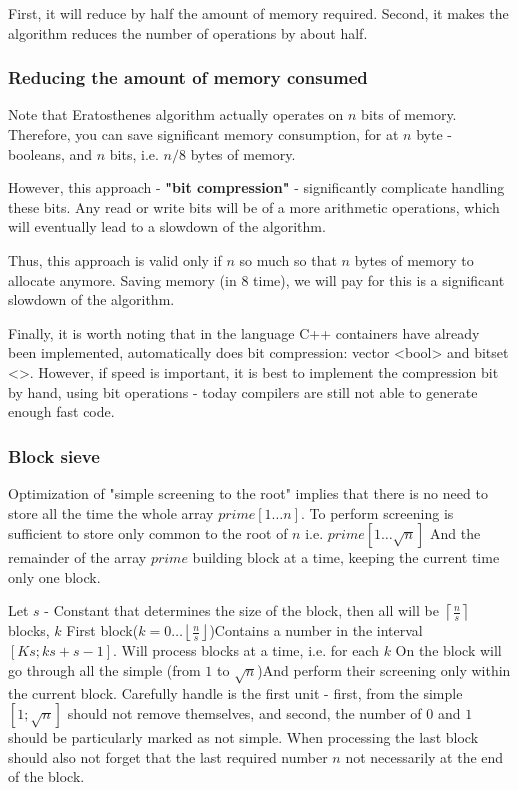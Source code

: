 First, it will reduce by half the amount of memory required. Second, it makes the algorithm reduces the number of operations by about half.

\subsubsection{ Reducing the amount of memory consumed }

Note that Eratosthenes algorithm actually operates on $n$ bits of memory. Therefore, you can save significant memory consumption, for at $n$ byte - booleans, and $n$ bits, i.e. $n / 8$ bytes of memory.

However, this approach - \textbf{"bit compression"} - significantly complicate handling these bits. Any read or write bits will be of a more arithmetic operations, which will eventually lead to a slowdown of the algorithm.

Thus, this approach is valid only if $n$ so much so that $n$ bytes of memory to allocate anymore. Saving memory (in $8$ time), we will pay for this is a significant slowdown of the algorithm.

Finally, it is worth noting that in the language C++ containers have already been implemented, automatically does bit compression: vector <bool> and bitset <>. However, if speed is important, it is best to implement the compression bit by hand, using bit operations - today compilers are still not able to generate enough fast code.

\subsubsection{ Block sieve }

Optimization of "simple screening to the root" implies that there is no need to store all the time the whole array $prime [1 \ldots n]$. To perform screening is sufficient to store only common to the root of $n$ i.e. $prime [1 \ldots \sqrt {n}]$ And the remainder of the array $prime$ building block at a time, keeping the current time only one block.

Let $s$ - Constant that determines the size of the block, then all will be $\left \lceil \frac {n} {s} \right \rceil$ blocks, $k$ First block($k = 0 \ldots \left \lfloor \frac {n} {s} \right \rfloor$)Contains a number in the interval $[Ks; ks + s-1]$. Will process blocks at a time, i.e. for each $k$ On the block will go through all the simple (from $1$ to $\sqrt {n}$)And perform their screening only within the current block. Carefully handle is the first unit - first, from the simple $[1; \sqrt {n}]$ should not remove themselves, and second, the number of $0$ and $1$ should be particularly marked as not simple. When processing the last block should also not forget that the last required number $n$ not necessarily at the end of the block.

